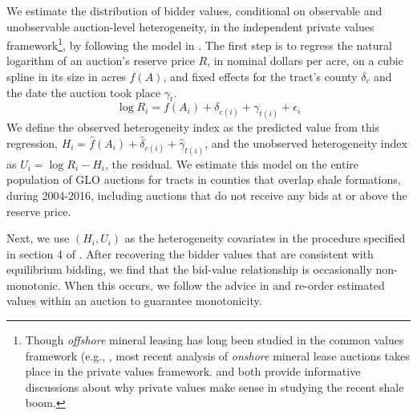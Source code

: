 \begin{appendices}
We estimate the distribution of bidder values, conditional on observable and unobservable auction-level heterogeneity, in the independent private values framework\footnote{Though \textit{offshore} mineral leasing has long been studied in the common values framework (e.g., \cite{hendricks_empirical_1988}, most recent analysis of \textit{onshore} mineral lease auctions takes place in the private values framework.  \cite{kong2016sequential} and \cite{kong_selective_2017} both provide informative discussions about why private values make sense in studying the recent shale boom.}, by following the model in \cite{roberts2013unobserved}.  The first step is to regress the natural logarithm of an auction's reserve price $R$, in nominal dollars per acre, on a cubic spline in its size in acres $f(A)$, and fixed effects for the tract's county $\delta_{c}$ and the date the auction took place $\gamma_{t}$.
\begin{equation*}
	\log R_i = f(A_i) + \delta_{c(i)} + \gamma_{t(i)} + \epsilon_i
\end{equation*}
We define the observed heterogeneity index as the predicted value from this regression, $H_i = \widehat{f}(A_i) + \widehat{\delta}_{c(i)} + \widehat{\gamma}_{t(i)}$, and the unobserved heterogeneity index as $U_i = \log R_i - H_i$, the residual.  We estimate this model on the entire population of GLO auctions for tracts in counties that overlap shale formations, during 2004-2016, including auctions that do not receive any bids at or above the reserve price.

Next, we use $(H_i,U_i)$ as the heterogeneity covariates in the procedure specified in section 4 of \cite{guerre2000optimal}.  After recovering the bidder values that are consistent with equilibrium bidding, we find that the bid-value relationship is occasionally non-monotonic.  When this occurs, we follow the advice in \cite{chernozhukov2009improving} and re-order estimated values within an auction to guarantee monotonicity.


\end{appendices}

